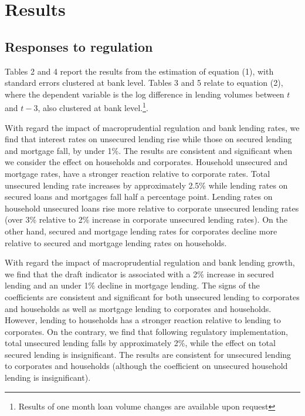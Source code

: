 \documentclass[
  letterpaper,
  DIV=11,
  numbers=noendperiod]{scrartcl}
\begin{document}
\section{Results}\label{results}

\subsection{Responses to regulation}\label{responses-to-regulation}

Tables 2 and 4 report the results from the estimation of equation (1),
with standard errors clustered at bank level. Tables 3 and 5 relate to
equation (2), where the dependent variable is the log difference in
lending volumes between \(t\) and \(t-3\), also clustered at bank
level.\footnote{Results of one month loan volume changes are available upon request}.

With regard the impact of macroprudential regulation and bank lending
rates, we find that interest rates on unsecured lending rise while those
on secured lending and mortgage fall, by under 1\%. The results are
consistent and significant when we consider the effect on households and
corporates. Household unsecured and mortgage rates, have a stronger
reaction relative to corporate rates. Total unsecured lending rate
increases by approximately 2.5\% while lending rates on secured loans
and mortgages fall half a percentage point. Lending rates on household
unsecured loans rise more relative to corporate unsecured lending rates
(over 3\% relative to 2\% increase in corporate unsecured lending
rates). On the other hand, secured and mortgage lending rates for
corporates decline more relative to secured and mortgage lending rates
on households.

With regard the impact of macroprudential regulation and bank lending
growth, we find that the draft indicator is associated with a 2\%
increase in secured lending and an under 1\% decline in mortgage
lending. The signs of the coefficients are consistent and significant
for both unsecured lending to corporates and households as well as
mortgage lending to corporates and households. However, lending to
households has a stronger reaction relative to lending to corporates. On
the contrary, we find that following regulatory implementation, total
unsecured lending falls by approximately 2\%, while the effect on total
secured lending is insignificant. The results are consistent for
unsecured lending to corporates and households (although the coefficient
on unsecured household lending is insignificant).
\end{document}
